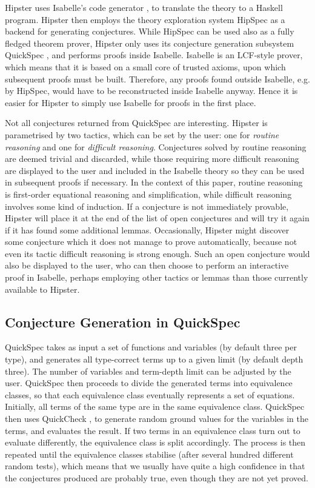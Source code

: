 Hipster uses Isabelle's code generator \cite{codegen2}, to translate the theory to a Haskell program.
%
Hipster then employs the theory exploration system HipSpec as a backend for generating conjectures.
%
While HipSpec can be used also as a fully fledged theorem prover, Hipster only uses its conjecture generation subsystem QuickSpec \cite{quickspec}, and performs proofs inside Isabelle.
%
Isabelle is an LCF-style prover, which means that it is based on a small core of trusted axioms, upon which subsequent proofs must be built.
%
Therefore, any proofs found outside Isabelle, e.g. by HipSpec, would have to be reconstructed inside Isabelle anyway.
%
Hence it is easier for Hipster to simply use Isabelle for proofs in the first place. 

Not all conjectures returned from QuickSpec are interesting.
%
Hipster is parametrised by two tactics, which can be set by the user: one for \emph{routine reasoning} and one for \emph{difficult reasoning}.
%
Conjectures solved by routine reasoning are deemed trivial and discarded, while those requiring more difficult reasoning are displayed to the user and included in the Isabelle theory so they can be used in subsequent proofs if necessary.
%
In the context of this paper, routine reasoning is first-order equational reasoning and simplification, while difficult reasoning involves some kind of induction.
%
If a conjecture is not immediately provable, Hipster will place it at the end of the list of open conjectures and will try it again if it has found some additional lemmas.
%
Occasionally, Hipster might discover some conjecture which it does not manage to prove automatically, because not even its tactic difficult reasoning is strong enough.
%
Such an open conjecture would also be displayed to the user, who can then choose to perform an interactive proof in Isabelle, perhaps employing other tactics or lemmas than those currently available to Hipster.


\subsection{Conjecture Generation in QuickSpec}
QuickSpec takes as input a set of functions and variables (by default three per type), and generates all type-correct terms up to a given limit (by default depth three).
%
The number of variables and term-depth limit can be adjusted by the user.
%
QuickSpec then proceeds to divide the generated terms into equivalence classes, so that each equivalence class eventually represents a set of equations.
%
Initially, all terms of the same type are in the same equivalence class.
%
QuickSpec then uses QuickCheck \cite{quickcheck}, to generate random ground values for the variables in the terms, and evaluates the result.
%
If two terms in an equivalence class turn out to evaluate differently, the equivalence class is split accordingly.
%
The process is then repeated until the equivalence classes stabilise (after several hundred different random tests), which means that we usually have quite a high confidence in that the conjectures produced are probably true, even though they are not yet proved.  


